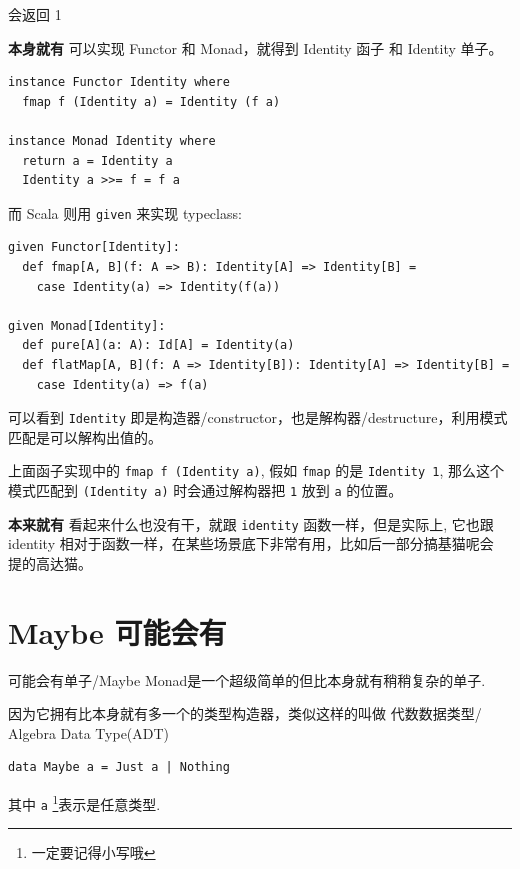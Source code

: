 \documentclass[letterspacing]{tufte-book}
\begin{document}
会返回 1

\textbf{本身就有} 可以实现 Functor 和 Monad，就得到 Identity 函子 和 Identity 单子。

\lstset{language=haskell,label= ,caption= ,captionpos=b,numbers=none}
\begin{lstlisting}
instance Functor Identity where
  fmap f (Identity a) = Identity (f a)

instance Monad Identity where
  return a = Identity a
  Identity a >>= f = f a
\end{lstlisting}

而 Scala 则用 \texttt{given} 来实现 typeclass:

\lstset{language=scala,label= ,caption= ,captionpos=b,numbers=none}
\begin{lstlisting}
given Functor[Identity]:
  def fmap[A, B](f: A => B): Identity[A] => Identity[B] =
    case Identity(a) => Identity(f(a))

given Monad[Identity]:
  def pure[A](a: A): Id[A] = Identity(a)
  def flatMap[A, B](f: A => Identity[B]): Identity[A] => Identity[B] =
    case Identity(a) => f(a)
\end{lstlisting}

可以看到 \texttt{Identity} 即是构造器/constructor，也是解构器/destructure，利用模式匹配是可以解构出值的。

上面函子实现中的 \texttt{fmap f (Identity a)}, 假如 \texttt{fmap} 的是 \texttt{Identity 1},
那么这个模式匹配到 \texttt{(Identity a)} 时会通过解构器把 \texttt{1} 放到 \texttt{a} 的位置。

\textbf{本来就有} 看起来什么也没有干，就跟 \texttt{identity} 函数一样，但是实际上, 它也跟 identity 相对于函数一样，在某些场景底下非常有用，比如后一部分搞基猫呢会
提的高达猫。

\chapter{Maybe 可能会有}
\label{sec:org038ba9f}
可能会有单子/Maybe Monad是一个超级简单的但比本身就有稍稍复杂的单子.

因为它拥有比本身就有多一个的类型构造器，类似这样的叫做 代数数据类型/ Algebra Data Type(ADT)

\lstset{language=haskell,label= ,caption= ,captionpos=b,numbers=none}
\begin{lstlisting}
data Maybe a = Just a | Nothing
\end{lstlisting}

其中 \texttt{a} \footnote{一定要记得小写哦}表示是任意类型.
\end{document}
